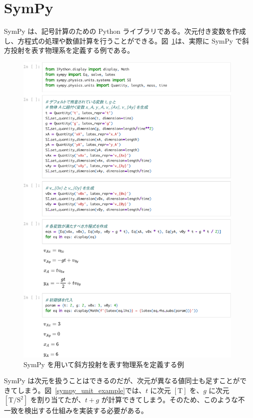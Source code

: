 \section{SymPy}
SymPy は、記号計算のための Python ライブラリである。次元付き変数を作成し、方程式の処理や数値計算を行うことができる。図~\ref{sympy_example}は、実際に SymPy で斜方投射を表す物理系を定義する例である。

\begin{figure}[p]
\centering
\includegraphics[width=\linewidth]{work/SymPy_example-crop.pdf}
\caption{SymPy を用いて斜方投射を表す物理系を定義する例} \label{sympy_example}
\end{figure}

SymPy は次元を扱うことはできるのだが、次元が異なる値同士も足すことができてしまう。図~\ref{sympy_unit_example}では、$t$ に次元 $\mathrm{[T]}$ を、$g$ に次元 $\mathrm{[T/S^2]}$ を割り当てたが、$t + g$ が計算できてしまう。そのため、このような不一致を検出する仕組みを実装する必要がある。

